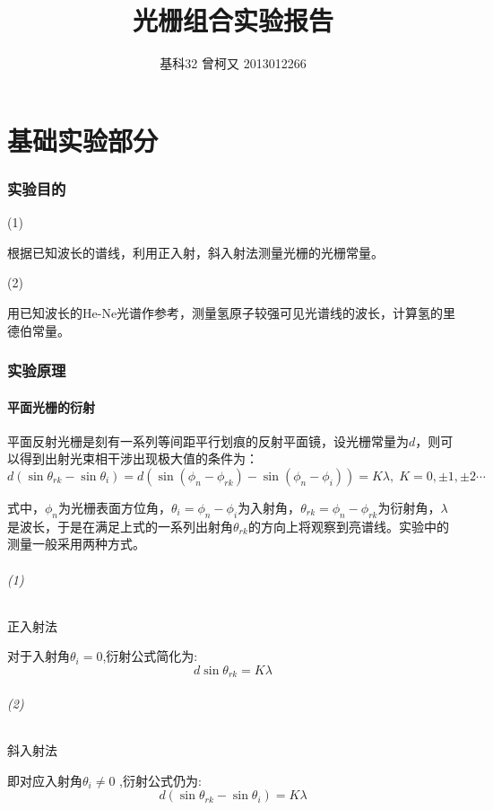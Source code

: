 \documentclass[10pt,a4paper,nocap]{ctexart}
\begin{document}
	\title{光栅组合实验报告}
	\author{基科32 曾柯又 2013012266}
	\date{\vspace{-5ex}}
	\maketitle
	\part{基础实验部分}
	\section{实验目的}
	\subparagraph{(1)}根据已知波长的谱线，利用正入射，斜入射法测量光栅的光栅常量。
	\subparagraph{(2)}用已知波长的He-Ne光谱作参考，测量氢原子较强可见光谱线的波长，计算氢的里德伯常量。
	\section{实验原理}
		\subsection{平面光栅的衍射}
	平面反射光栅是刻有一系列等间距平行划痕的反射平面镜，设光栅常量为$ d $，则可以得到出射光束相干涉出现极大值的条件为：\[d(\sin\theta_{rk} - \sin\theta_i) = d(\sin(\phi_n - \phi_{rk}) - \sin(\phi_n - \phi_i))= K\lambda,\; K = 0,\pm1,\pm2 \cdots\]
	
	 式中，\(\phi_n\)为光栅表面方位角，\(\theta_i = \phi
		 _n - \phi_i\)为入射角，\(\theta_{rk} = \phi_n - \phi_{rk}\)为衍射角，\(\lambda\)是波长，于是在满足上式的一系列出射角\(\theta_{rk}\)的方向上将观察到亮谱线。实验中的测量一般采用两种方式。
		 \paragraph{(1)}正入射法
		 
		 对于入射角\(\theta_i = 0\),衍射公式简化为:\[d\sin\theta_{rk} = K\lambda\]
		 \paragraph{(2)}斜入射法
		 
		 即对应入射角\(\theta_i \neq 0\) ,衍射公式仍为:\[d(\sin\theta_{rk} - \sin\theta_i) = K\lambda \]
		 
\end{document}
